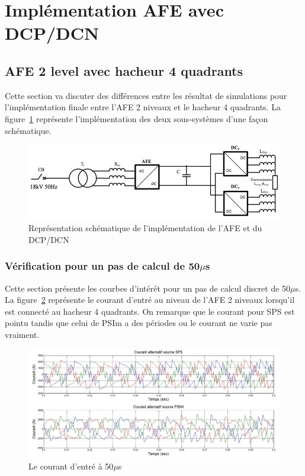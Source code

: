 \documentclass[11pt,letterpaper,final]{report}
\begin{document}
\clearpage
\section{Implémentation AFE avec DCP/DCN}
\subsection{AFE 2 level avec hacheur 4 quadrants}
Cette section va discuter des différences entre les résultat de simulations pour l'implémentation finale entre l'AFE 2 niveaux et le hacheur 4 quadrants. La figure~\ref{AF_DC} représente l'implémentation des deux sous-systèmes d'une façon schématique.
\begin{figure}[htb]
\centering
\includegraphics[scale=0.5]{Fig/Hach_AFE/AFE.jpg}
\caption{Représentation schématique de l'implémentation de l'AFE et du DCP/DCN}
\label{AF_DC}
\end{figure}


\subsubsection{Vérification pour un pas de calcul de 50$\mu$s}
Cette section présente les courbes d'intérêt pour un pas de calcul discret de 50$\mu$s. La figure~\ref{AF_HA_cou50} représente le courant d'entré au niveau de l'AFE 2 niveaux lorsqu'il est connecté au hacheur 4 quadrants. On remarque que le courant pour SPS est pointu tandis que celui de PSIm a des périodes ou le courant ne varie pas vraiment.

\begin{figure}[htb]
\centering
\includegraphics[scale=0.5]{Fig/Hach_AFE/50u/cour_al.jpg}
\caption{Le courant d'entré à 50$\mu$s}
\label{AF_HA_cou50}
\end{figure}
\end{document}
